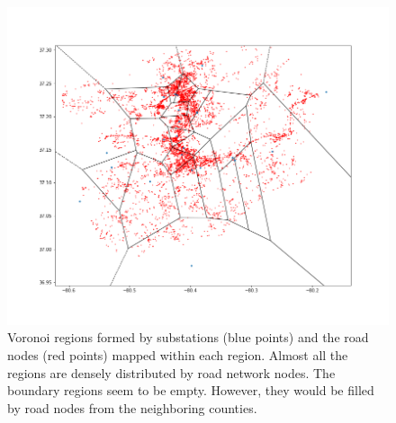 \begin{figure}[H]
	\centering
	\includegraphics[scale=0.42]{map2}
	\caption{Voronoi regions formed by substations (blue points) and the road nodes (red points) mapped within each region. Almost all the regions are densely distributed by road network nodes. The boundary regions seem to be empty. However, they would be filled by road nodes from the neighboring counties.}
\end{figure}
